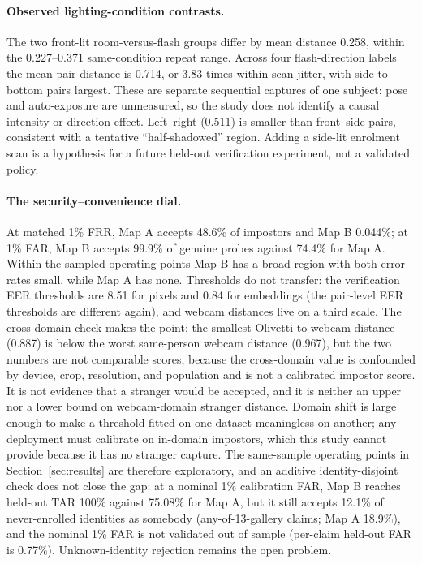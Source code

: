 \paragraph{Observed lighting-condition contrasts.} The two front-lit room-versus-flash groups differ by mean distance 0.258, within the 0.227--0.371 same-condition repeat range. Across four flash-direction labels the mean pair distance is 0.714, or 3.83 times within-scan jitter, with side-to-bottom pairs largest. These are separate sequential captures of one subject: pose and auto-exposure are unmeasured, so the study does not identify a causal intensity or direction effect. Left--right (0.511) is smaller than front--side pairs, consistent with a tentative ``half-shadowed'' region. Adding a side-lit enrolment scan is a hypothesis for a future held-out verification experiment, not a validated policy.

\paragraph{The security--convenience dial.} At matched 1\% FRR, Map A accepts 48.6\% of impostors and Map B 0.044\%; at 1\% FAR, Map B accepts 99.9\% of genuine probes against 74.4\% for Map A. Within the sampled operating points Map B has a broad region with both error rates small, while Map A has none. Thresholds do not transfer: the verification EER thresholds are 8.51 for pixels and 0.84 for embeddings (the pair-level EER thresholds are different again), and webcam distances live on a third scale. The cross-domain check makes the point: the smallest Olivetti-to-webcam distance (0.887) is below the worst same-person webcam distance (0.967), but the two numbers are not comparable scores, because the cross-domain value is confounded by device, crop, resolution, and population and is not a calibrated impostor score. It is not evidence that a stranger would be accepted, and it is neither an upper nor a lower bound on webcam-domain stranger distance. Domain shift is large enough to make a threshold fitted on one dataset meaningless on another; any deployment must calibrate on in-domain impostors, which this study cannot provide because it has no stranger capture. The same-sample operating points in Section~\ref{sec:results} are therefore exploratory, and an additive identity-disjoint check does not close the gap: at a nominal 1\% calibration FAR, Map B reaches held-out TAR 100\% against 75.08\% for Map A, but it still accepts 12.1\% of never-enrolled identities as somebody (any-of-13-gallery claims; Map A 18.9\%), and the nominal 1\% FAR is not validated out of sample (per-claim held-out FAR is 0.77\%). Unknown-identity rejection remains the open problem.

